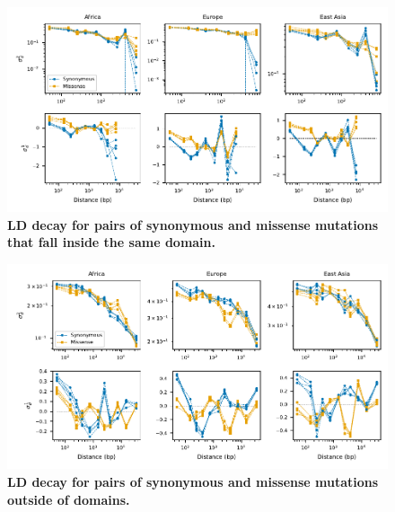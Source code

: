 \documentclass[]{article}
\begin{document}
\begin{figure}[ht!]
    \centering
    \includegraphics{../figures/ld_decay_in_domain}
    \caption{
        \textbf{LD decay for pairs of synonymous and missense mutations
        that fall inside the same domain.}
    }
    \label{fig:LDwithin}
\end{figure}

\begin{figure}[ht!]
    \centering
    \includegraphics{../figures/ld_decay_outside_domains}
    \caption{
        \textbf{LD decay for pairs of synonymous and missense mutations
        outside of domains.}
    }
    \label{fig:LDoutside}
\end{figure}
\end{document}
